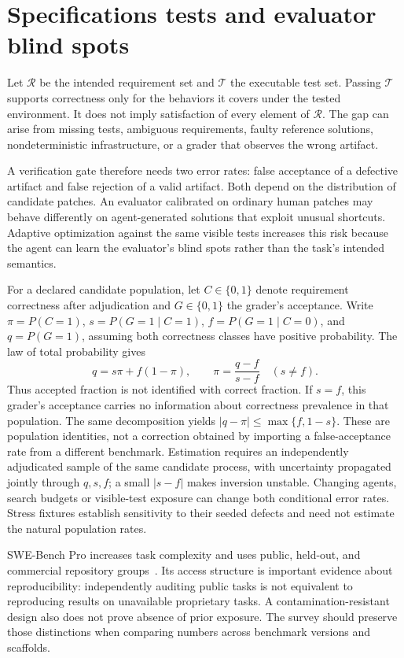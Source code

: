 \section{Specifications tests and evaluator blind spots}\label{sec:C23:specification}
Let $\mathcal R$ be the intended requirement set and $\mathcal T$ the executable test set. Passing $\mathcal T$ supports correctness only for the behaviors it covers under the tested environment. It does not imply satisfaction of every element of $\mathcal R$. The gap can arise from missing tests, ambiguous requirements, faulty reference solutions, nondeterministic infrastructure, or a grader that observes the wrong artifact.

A verification gate therefore needs two error rates: false acceptance of a defective artifact and false rejection of a valid artifact. Both depend on the distribution of candidate patches. An evaluator calibrated on ordinary human patches may behave differently on agent-generated solutions that exploit unusual shortcuts. Adaptive optimization against the same visible tests increases this risk because the agent can learn the evaluator's blind spots rather than the task's intended semantics.

For a declared candidate population, let $C\in\{0,1\}$ denote requirement correctness after adjudication and $G\in\{0,1\}$ the grader's acceptance. Write $\pi=P(C=1)$, $s=P(G=1\mid C=1)$, $f=P(G=1\mid C=0)$, and $q=P(G=1)$, assuming both correctness classes have positive probability. The law of total probability gives
\begin{equation}
 q=s\pi+f(1-\pi),\qquad
 \pi=\frac{q-f}{s-f}\quad(s\ne f).
 \label{eq:C23:grader_acceptance_mixture}
\end{equation}
Thus accepted fraction is not identified with correct fraction. If $s=f$, this grader's acceptance carries no information about correctness prevalence in that population. The same decomposition yields $|q-\pi|\leq\max\{f,1-s\}$. These are population identities, not a correction obtained by importing a false-acceptance rate from a different benchmark. Estimation requires an independently adjudicated sample of the same candidate process, with uncertainty propagated jointly through $q,s,f$; a small $|s-f|$ makes inversion unstable. Changing agents, search budgets or visible-test exposure can change both conditional error rates. Stress fixtures establish sensitivity to their seeded defects and need not estimate the natural population rates.

SWE-Bench Pro increases task complexity and uses public, held-out, and commercial repository groups~\cite{corpus250916941}. Its access structure is important evidence about reproducibility: independently auditing public tasks is not equivalent to reproducing results on unavailable proprietary tasks. A contamination-resistant design also does not prove absence of prior exposure. The survey should preserve those distinctions when comparing numbers across benchmark versions and scaffolds.

